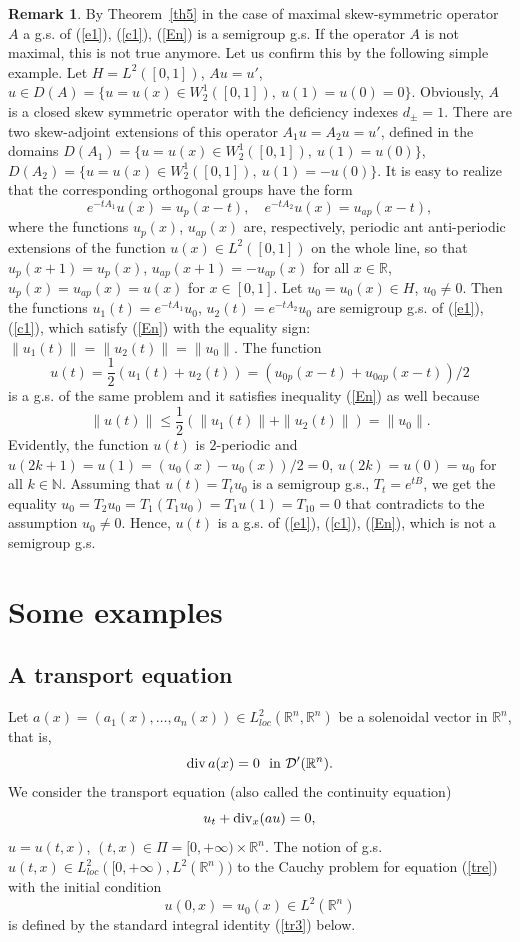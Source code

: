 \documentclass[12pt]{article}
\newcommand{\R}{{\mathbb R}}
\newcommand{\N}{{\mathbb N}}
\newcommand{\D}{{\mathcal D}}
\renewcommand{\div}{\mathop{\rm div}\nolimits}
\numberwithin{equation}{section}
\theoremstyle{plain}
\theoremstyle{definition}
\newtheorem{remark}{Remark}[section]
\begin{document}
\begin{remark}\label{rem3}
By Theorem~\ref{th5} in the case of maximal skew-symmetric operator $A$ a g.s. of (\ref{e1}), (\ref{c1}), (\ref{En}) is a semigroup g.s. If the operator $A$ is not maximal, this is not true anymore. Let us confirm this by the following simple example. Let $H=L^2([0,1])$, $Au=u'$, $u\in D(A)=\{ u=u(x)\in W_2^1([0,1]), \ u(1)=u(0)=0\}$. Obviously, $A$ is a closed skew symmetric operator with the deficiency indexes $d_\pm=1$. There are two skew-adjoint extensions of this operator
$A_1u=A_2u=u'$, defined in the domains $D(A_1)=\{ u=u(x)\in W_2^1([0,1]), \ u(1)=u(0)\}$, $D(A_2)=\{ u=u(x)\in W_2^1([0,1]), \ u(1)=-u(0)\}$. It is easy to realize that the corresponding orthogonal groups have the form
\[ e^{-tA_1}u(x)=u_p(x-t), \quad e^{-tA_2}u(x)=u_{ap}(x-t),
\]
where the functions $u_p(x)$, $u_{ap}(x)$ are, respectively, periodic ant anti-periodic extensions of the function $u(x)\in L^2([0,1])$ on the whole line, so that  $u_p(x+1)=u_p(x)$, $u_{ap}(x+1)=-u_{ap}(x)$ for all $x\in\R$, $u_p(x)=u_{ap}(x)=u(x)$ for $x\in [0,1]$. Let $u_0=u_0(x)\in H$, $u_0\not=0$. Then the functions $u_1(t)=e^{-tA_1}u_0$, $u_2(t)=e^{-tA_2}u_0$ are semigroup g.s. of (\ref{e1}), (\ref{c1}), which satisfy (\ref{En}) with the equality sign: $\|u_1(t)\|=\|u_2(t)\|=\|u_0\|$. The function \[u(t)=\frac{1}{2}(u_1(t)+u_2(t))=(u_{0p}(x-t)+u_{0ap}(x-t))/2\]
is a g.s. of the same problem and it satisfies inequality (\ref{En}) as well because
\[
\|u(t)\|\le\frac{1}{2}(\|u_1(t)\|+\|u_2(t)\|)=\|u_0\|.
\]
Evidently, the function $u(t)$ is $2$-periodic and $u(2k+1)=u(1)=(u_0(x)-u_0(x))/2=0$, $u(2k)=u(0)=u_0$ for all $k\in\N$.
Assuming that $u(t)=T_t u_0$ is a semigroup g.s., $T_t=e^{tB}$, we get the equality
$u_0=T_2u_0=T_1(T_1u_0)=T_1u(1)=T_10=0$ that contradicts to the assumption $u_0\not=0$. Hence, $u(t)$ is a g.s. of  (\ref{e1}), (\ref{c1}), (\ref{En}), which is not a semigroup g.s.
\end{remark}

\section{Some examples}

\subsection{A transport equation}\label{subsec1}
Let $a(x)=(a_1(x),\ldots,a_n(x)) \in L^2_{loc}(\R^n,\R^n)$ be a solenoidal vector in $\R^n$, that is,
\begin{equation}\label{sol}
\div a(x)=0 \ \mbox{ in } \D'(\R^n).
\end{equation}
We consider the transport equation (also called the continuity equation)
\begin{equation}\label{tre}
u_t+\div_x (au)=0,
\end{equation}
$u=u(t,x)$, $(t,x)\in\Pi=[0,+\infty)\times\R^n$. The notion of g.s. $u(t,x)\in L^2_{loc}([0,+\infty),L^2(\R^n))$ to the Cauchy problem for equation (\ref{tre}) with the initial condition
\begin{equation}\label{tri}
u(0,x)=u_0(x)\in L^2(\R^n)
\end{equation}
is defined by the standard integral identity (\ref{tr3}) below.
\end{document}
